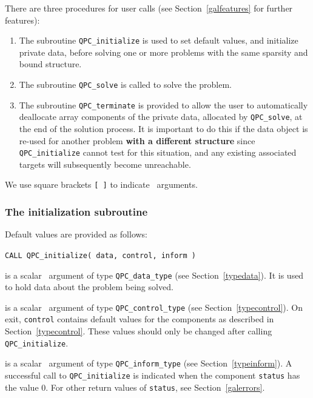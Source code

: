 \documentclass{galahad}
\newcommand{\packagename}{QPC}
\begin{document}

\galarguments
There are three procedures for user calls
(see Section~\ref{galfeatures} for further features): 

\begin{enumerate}
\item The subroutine 
      {\tt \packagename\_initialize} 
      is used to set default values, and initialize private data, 
      before solving one or more problems with the
      same sparsity and bound structure.
\item The subroutine 
      {\tt \packagename\_solve} 
      is called to solve the problem.
\item The subroutine 
      {\tt \packagename\_terminate} 
      is provided to allow the user to automatically deallocate array 
       components of the private data, allocated by 
       {\tt \packagename\_solve}, 
       at the end of the solution process. 
       It is important to do this if the data object is re-used for another 
       problem {\bf with a different structure}
       since {\tt \packagename\_initialize} cannot test for this situation, 
       and any existing associated targets will subsequently become unreachable.
\end{enumerate}
We use square brackets {\tt [ ]} to indicate \optional\ arguments.


\subsubsection{The initialization subroutine}\label{subinit}
 Default values are provided as follows:
\vspace*{1mm}

\hspace{8mm}
{\tt CALL \packagename\_initialize( data, control, inform )}

\vspace*{-3mm}
\begin{description}

 is a scalar \intentinout\ argument of type 
{\tt \packagename\_data\_type}
(see Section~\ref{typedata}). It is used to hold data about the problem being 
solved. 

 is a scalar \intentout\ argument of type 
{\tt \packagename\_control\_type}
(see Section~\ref{typecontrol}). 
On exit, {\tt control} contains default values for the components as
described in Section~\ref{typecontrol}.
These values should only be changed after calling 
{\tt \packagename\_initialize}.

 is a scalar \intentout\ argument of type 
{\tt \packagename\_inform\_type}
(see Section~\ref{typeinform}). A successful call to
{\tt \packagename\_initialize}
is indicated when the  component {\tt status} has the value 0. 
For other return values of {\tt status}, see Section~\ref{galerrors}.

\end{description}
\end{document}
